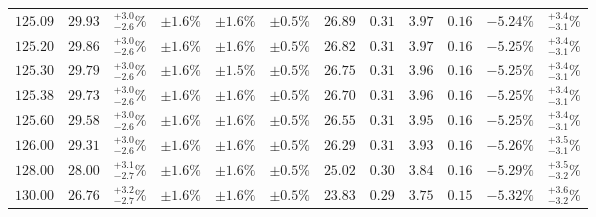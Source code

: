 \begin{landscape}
\begin{table}[ht!]
{\begin{tabular}{| cc | c | ccc | ccccc | c |}
$125.09$ & $29.93$ & $^{+3.0}_{-2.6}\%$ & $\pm 1.6\%$ & {\color{black!55}$\pm 1.6\%$} & {\color{black!55}$\pm 0.5\%$} & $26.89$ & $0.31$ & $3.97$ & $0.16$ & $-5.24\%$ & $^{+3.4}_{-3.1}\%$ \\
$125.20$ & $29.86$ & $^{+3.0}_{-2.6}\%$ & $\pm 1.6\%$ & {\color{black!55}$\pm 1.6\%$} & {\color{black!55}$\pm 0.5\%$} & $26.82$ & $0.31$ & $3.97$ & $0.16$ & $-5.25\%$ & $^{+3.4}_{-3.1}\%$ \\
$125.30$ & $29.79$ & $^{+3.0}_{-2.6}\%$ & $\pm 1.6\%$ & {\color{black!55}$\pm 1.5\%$} & {\color{black!55}$\pm 0.5\%$} & $26.75$ & $0.31$ & $3.96$ & $0.16$ & $-5.25\%$ & $^{+3.4}_{-3.1}\%$ \\
$125.38$ & $29.73$ & $^{+3.0}_{-2.6}\%$ & $\pm 1.6\%$ & {\color{black!55}$\pm 1.6\%$} & {\color{black!55}$\pm 0.5\%$} & $26.70$ & $0.31$ & $3.96$ & $0.16$ & $-5.25\%$ & $^{+3.4}_{-3.1}\%$ \\
$125.60$ & $29.58$ & $^{+3.0}_{-2.6}\%$ & $\pm 1.6\%$ & {\color{black!55}$\pm 1.6\%$} & {\color{black!55}$\pm 0.5\%$} & $26.55$ & $0.31$ & $3.95$ & $0.16$ & $-5.25\%$ & $^{+3.4}_{-3.1}\%$ \\
$126.00$ & $29.31$ & $^{+3.0}_{-2.6}\%$ & $\pm 1.6\%$ & {\color{black!55}$\pm 1.6\%$} & {\color{black!55}$\pm 0.5\%$} & $26.29$ & $0.31$ & $3.93$ & $0.16$ & $-5.26\%$ & $^{+3.5}_{-3.1}\%$ \\
$128.00$ & $28.00$ & $^{+3.1}_{-2.7}\%$ & $\pm 1.6\%$ & {\color{black!55}$\pm 1.6\%$} & {\color{black!55}$\pm 0.5\%$} & $25.02$ & $0.30$ & $3.84$ & $0.16$ & $-5.29\%$ & $^{+3.5}_{-3.2}\%$ \\
$130.00$ & $26.76$ & $^{+3.2}_{-2.7}\%$ & $\pm 1.6\%$ & {\color{black!55}$\pm 1.6\%$} & {\color{black!55}$\pm 0.5\%$} & $23.83$ & $0.29$ & $3.75$ & $0.15$ & $-5.32\%$ & $^{+3.6}_{-3.2}\%$ \\
\cline{1-12}
\end{tabular}
}
\end{table}


\end{landscape}
